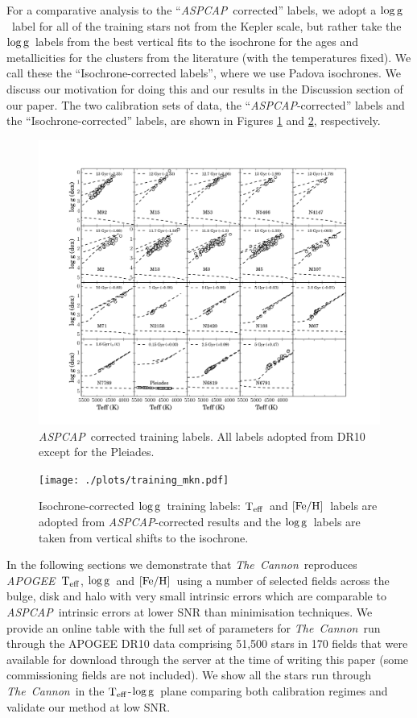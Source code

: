 \documentclass[12pt, preprint]{aastex}
\newcommand{\teff}{\mbox{$\rm T_{eff}$}}
\newcommand{\feh}{\mbox{$\rm [Fe/H]$}}
\newcommand{\logg}{\mbox{$\rm \log g$}}
\newcommand{\tc}{\textsl{The~Cannon}}
\newcommand{\apogee}{\textsl{APOGEE}}
\newcommand{\aspcap}{\textsl{ASPCAP}}
\begin{document}
For a comparative analysis to the ``\aspcap\ corrected'' labels, we adopt a \logg\ label for all of the training stars not from the Kepler scale, but rather take the \logg\ labels from the best vertical fits to the isochrone for the ages and metallicities for the clusters from the literature (with the temperatures fixed). We call these the ``Isochrone-corrected labels'', where we use Padova isochrones. We discuss our motivation for doing this and our results in the Discussion section of our paper.  The two calibration sets of data, the ``\aspcap-corrected'' labels and the ``Isochrone-corrected'' labels, are shown in Figures \ref{fig:trainingaspcap} and \ref{fig:trainingisochrone}, respectively. 

\begin{figure}[h!]
\centering
    \includegraphics[scale=0.33]{./plots/training_aspcap.pdf}
\caption{\aspcap\ corrected training labels. All labels adopted from DR10 except for the Pleiades. }
\label{fig:trainingaspcap}
\end{figure}

\begin{figure}[h!]
\centering
  \texttt{[image: ./plots/training\_mkn.pdf]}
\caption{Isochrone-corrected \logg\ training labels: \teff\ and \feh\ labels are adopted from \aspcap-corrected results and the \logg\ labels are taken from vertical shifts to the isochrone. }
\label{fig:trainingisochrone}
\end{figure}


In the following sections we demonstrate that \tc\ reproduces \apogee\ \teff, \logg\ and \feh\ using a number of selected fields across the bulge, disk and halo with very small intrinsic errors which are comparable to \aspcap\ intrinsic errors at lower SNR than minimisation techniques. We provide an online table with the full set of parameters for \tc\ run through the APOGEE DR10 data comprising 51,500 stars in 170 fields that were available for download through the server at the time of writing this paper (some commissioning fields are not included).  We show all the stars run through \tc\ in the \teff-\logg\ plane comparing both calibration regimes and validate our method at low SNR.
\end{document}
